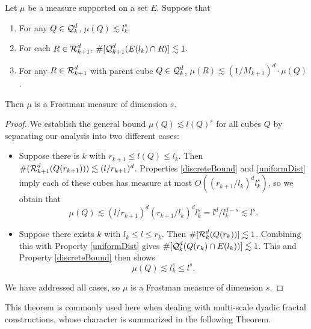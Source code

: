 \begin{lemma} \label{uniformMassFrostman}
	Let $\mu$ be a measure supported on a set $E$. Suppose that
    \begin{enumerate}
    	\item \label{discreteBound} For any $Q \in \operatorname{\mathcal{Q}}_k^d$, $\mu(Q) \lesssim l_k^s$.
    	\item \label{controlledScale} For each $R \in \operatorname{\mathcal{R}}_{k+1}^d$, $\#[\operatorname{\mathcal{Q}}_{k+1}^d(E(l_k) \cap R)] \lesssim 1$.
    	\item \label{uniformDist} For any $R \in \operatorname{\mathcal{R}}_{k+1}^d$ with parent cube $Q \in \operatorname{\mathcal{Q}}_k^d$, $\mu(R) \lesssim (1/M_{k+1})^d \cdot \mu(Q)$.
    \end{enumerate}
	Then $\mu$ is a Frostman measure of dimension $s$.
\end{lemma}
\begin{proof}
	We establish the general bound $\mu(Q) \lesssim l(Q)^s$ for all cubes $Q$ by separating our analysis into two different cases:
	\begin{itemize}
		\item Suppose there is $k$ with $r_{k+1} \leq l(Q) \leq l_k$. Then $\#(\operatorname{\mathcal{R}}_{k+1}^d(Q(r_{k+1}))) \lesssim (l/r_{k+1})^d$. Properties \ref{discreteBound} and \ref{uniformDist} imply each of these cubes has measure at most $O( (r_{k+1}/l_k)^d l_k^s)$, so we obtain that
    	\[ \mu(Q) \lesssim (l/r_{k+1})^d (r_{k+1}/l_k)^d l_k^s = l^d / l_k^{d-s} \lesssim l^s. \]

    \item Suppose there exists $k$ with $l_k \leq l \leq r_k$. Then $\#[\operatorname{\mathcal{R}}_k^d(Q(r_k))] \lesssim 1$. Combining this with Property \ref{uniformDist} gives $\#[\operatorname{\mathcal{Q}}_k^d(Q(r_k) \cap E(l_k))] \lesssim 1$. This and Property \ref{discreteBound} then shows
    \[ \mu(Q) \lesssim l_k^s \leq l^s. \]
	\end{itemize}
	We have addressed all cases, so $\mu$ is a Frostman measure of dimension $s$.
\end{proof}

This theorem is commonly used here when dealing with multi-scale dyadic fractal constructions, whose character is summarized in the following Theorem.

